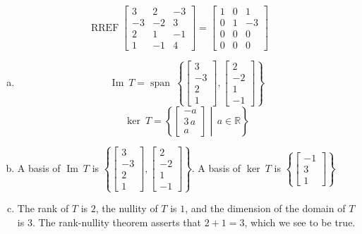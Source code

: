 \begin{exerciseAnswer} 


\[\operatorname{RREF} \left[\begin{array}{ccc}
3 & 2 & -3 \\
-3 & -2 & 3 \\
2 & 1 & -1 \\
1 & -1 & 4
\end{array}\right] = \left[\begin{array}{ccc}
1 & 0 & 1 \\
0 & 1 & -3 \\
0 & 0 & 0 \\
0 & 0 & 0
\end{array}\right] \]


\begin{enumerate}[(a)]
\item \[\operatorname{Im}\ T = \operatorname{span}\  \left\{ \left[\begin{array}{c}
3 \\
-3 \\
2 \\
1
\end{array}\right] , \left[\begin{array}{c}
2 \\
-2 \\
1 \\
-1
\end{array}\right] \right\} \]\[\operatorname{ker}\ T =  \left\{ \left[\begin{array}{c}
-a \\
3 \, a \\
a
\end{array}\right] \middle|\,a\in\mathbb{R}\right\} \]
\item  A basis of \(\operatorname{Im}\ T\) is \( \left\{ \left[\begin{array}{c}
3 \\
-3 \\
2 \\
1
\end{array}\right] , \left[\begin{array}{c}
2 \\
-2 \\
1 \\
-1
\end{array}\right] \right\} \). A basis of \(\operatorname{ker}\ T\) is \( \left\{ \left[\begin{array}{c}
-1 \\
3 \\
1
\end{array}\right] \right\} \)
\item  The rank of \(T\) is \( 2 \), the nullity of \(T\) is \( 1 \), and the dimension of the domain of \(T\) is \( 3 \). The rank-nullity theorem asserts that \( 2 + 1 = 3 \), which we see to be true. 
\end{enumerate}
    
\end{exerciseAnswer}
    
